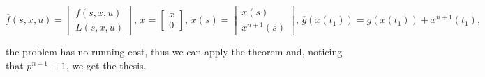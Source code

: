 \begin{equation*}
    \overline{f}(s,x,u)=\begin{bmatrix}
        f(s,x,u) \\
        L(s,x,u)
    \end{bmatrix},\,\overline{x}=\begin{bmatrix}
        x \\
        0
    \end{bmatrix},\,\overline{x}(s)=\begin{bmatrix}
        x(s) \\
        x^{n+1}(s)
    \end{bmatrix},\,\overline{g}(\overline{x}(t_1)) = g(x(t_1)) + x^{n+1}(t_1),
\end{equation*}

the problem has no running cost, thus we can apply the theorem and, noticing that 
$p^{n+1}\equiv1$, we get the thesis.

\clearpage